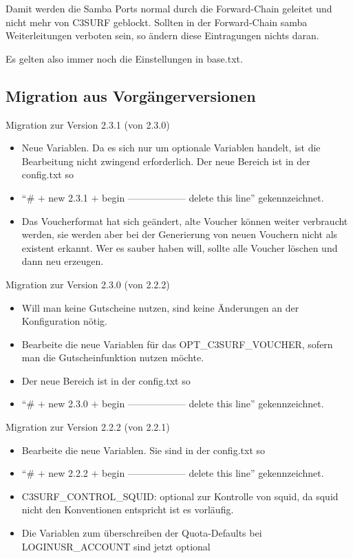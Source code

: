 Damit werden die Samba Ports normal durch die Forward-Chain geleitet und
nicht mehr von C3SURF geblockt. Sollten in der Forward-Chain samba
Weiterleitungen verboten sein, so ändern diese Eintragungen nichts daran.

Es gelten also immer noch die Einstellungen in base.txt.

\subsection{Migration aus Vorgängerversionen}

\item Migration zur Version 2.3.1 (von 2.3.0)
     \begin{itemize}
     \item Neue Variablen. Da es sich nur um optionale Variablen handelt,
           ist die Bearbeitung nicht zwingend erforderlich. Der neue Bereich ist in der config.txt so
     \item ``\# $+$ new 2.3.1 $+$ begin ------------------ delete this line'' gekennzeichnet.
     \item Das Voucherformat hat sich geändert, alte Voucher können weiter verbraucht werden,
           sie werden aber bei der Generierung von neuen Vouchern nicht als existent erkannt.
           Wer es sauber haben will, sollte alle Voucher löschen und dann neu erzeugen.
     \end{itemize}

\item Migration zur Version 2.3.0 (von 2.2.2)
    \begin{itemize}
    \item Will man keine Gutscheine nutzen, sind keine Änderungen an der Konfiguration nötig.
    \item Bearbeite die neue Variablen für das OPT\_C3SURF\_VOUCHER, sofern man die Gutscheinfunktion nutzen möchte.
    \item Der neue Bereich ist in der config.txt so
    \item ``\# $+$ new 2.3.0 $+$ begin ------------------ delete this line'' gekennzeichnet.
\end{itemize}

\item Migration zur Version 2.2.2 (von 2.2.1)
    \begin{itemize}
    \item Bearbeite die neue Variablen. Sie sind in der config.txt so 
    \item ``\# $+$ new 2.2.2 $+$ begin ------------------ delete this line'' gekennzeichnet.
    \item C3SURF\_CONTROL\_SQUID: optional zur Kontrolle von squid, da squid nicht den Konventionen entspricht ist
    es vorläufig.
    \item Die Variablen zum überschreiben der Quota-Defaults bei LOGINUSR\_ACCOUNT sind jetzt optional
\end{itemize}

